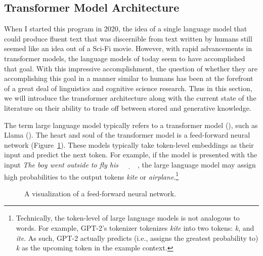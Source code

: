 \documentclass[
  12pt,
  letterpaper,
]{scrreprt}
\begin{document}
\subsection{Transformer Model
Architecture}\label{transformer-model-architecture}

When I started this program in 2020, the idea of a single language model
that could produce fluent text that was discernible from text written by
humans still seemed like an idea out of a Sci-Fi movie. However, with
rapid advancements in transformer models, the language models of today
seem to have accomplished that goal. With this impressive
accomplishment, the question of whether they are accomplishing this goal
in a manner similar to humans has been at the forefront of a great deal
of linguistics and cognitive science research. Thus in this section, we
will introduce the transformer architecture along with the current state
of the literature on their ability to trade off between stored and
generative knowledge.

The term large language model typically refers to a transformer model
(), such
as Llama ().
The heart and soul of the transformer model is a feed-forward neural
network (Figure~\ref{fig-neuralnet}). These models typically take
token-level embeddings as their input and predict the next token. For
example, if the model is presented with the input \emph{The boy went
outside to fly his} \(\underline{\hspace{1cm}}\), the large language
model may assign high probabilities to the output tokens \emph{kite} or
\emph{airplane}.\footnote{Technically, the token-level of large language
  models is not analogous to words. For example, GPT-2's tokenizer
  tokenizes \emph{kite} into two tokens: \emph{k}, and \emph{ite}. As
  such, GPT-2 actually predicts (i.e., assigns the greatest probability
  to) \emph{k} as the upcoming token in the example context.}

\begin{figure}[htbp]

\caption{\label{fig-neuralnet}A visualization of a feed-forward neural
network.}


\end{figure}%
\end{document}
